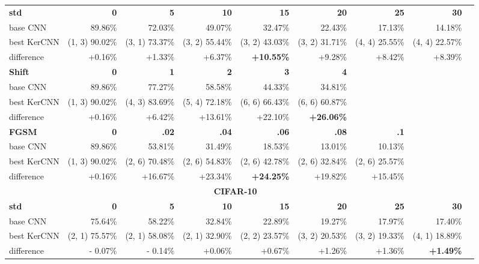 \documentclass[11pt,oneside,reqno]{amsart}
\begin{document}
{\begin{table}[htbp!]
\begin{tabular}{@{}lrrrrrrrr@{}}
    \textbf{std } & \textbf{0} & \textbf{5} & \textbf{10} & \textbf{15} & \textbf{20} & \textbf{25} & \textbf{30} \\
     base CNN    & 89.86\% & 72.03\% & 49.07\% & 32.47\% & 22.43\% & 17.13\% & 14.18\% \\ 
      best KerCNN & (1, 3) 90.02\% & (3, 1) 73.37\% & (3, 2) 55.44\% & (3, 2) 43.03\% & (3, 2) 31.71\% & (4, 4) 25.55\% & (4, 4) 22.57\% \\
      difference & +0.16\% & +1.33\% & +6.37\% & \textbf{+10.55\%} & +9.28\% & +8.42\% & +8.39\% \vspace{5pt}\\  
    \textbf{Shift } & \textbf{0} & \textbf{1} & \textbf{2} & \textbf{3} & \textbf{4} & & \\
   base CNN    & 89.86\% & 77.27\% & 58.58\% & 44.33\% & 34.81\% &  & \\ 
      best KerCNN & (1, 3) 90.02\% & (4, 3) 83.69\% & (5, 4) 72.18\% & (6, 6) 66.43\% & (6, 6) 60.87\% &  & \\
    difference & +0.16\% & +6.42\% & +13.61\% & +22.10\% & \textbf{+26.06\%} & & \vspace{5pt}\\
  \textbf{FGSM } & \textbf{0} & \textbf{.02} & \textbf{.04} & \textbf{.06} & \textbf{.08} & \textbf{.1} & \\
   base CNN    & 89.86\% & 53.81\% & 31.49\% & 18.53\% & 13.01\% & 10.13\% &  \\ 
      best KerCNN & (1, 3) 90.02\% & (2, 6) 70.48\% & (2, 6) 54.83\% & (2, 6) 42.78\% & (2, 6) 32.84\% & (2, 6) 25.57\% &  \\
    difference & +0.16\% & +16.67\% & +23.34\% & \textbf{+24.25\%} & +19.82\% & +15.45\% & \\
      \midrule
      \multicolumn{8}{c}{\textbf{CIFAR-10}}\vspace{5pt}\\
     \textbf{std } & \textbf{0} & \textbf{5} & \textbf{10} & \textbf{15} & \textbf{20} & \textbf{25} & \textbf{30} \\
      base CNN  & 75.64\% & 58.22\% & 32.84\% & 22.89\% & 19.27\% & 17.97\% & 17.40\% \\ 
      best KerCNN  & (2, 1) 75.57\% & (2, 1) 58.08\% & (2, 1) 32.90\% & (2, 2) 23.57\% & (3, 2) 20.53\% & (3, 2) 19.33\% & (4, 1) 18.89\% \\
      difference & - 0.07\% & - 0.14\% & +0.06\% & +0.67\% & +1.26\% & +1.36\% & \textbf{+1.49\%} \vspace{5pt}\\ 

\end{tabular}
\end{table}}
\end{document}
